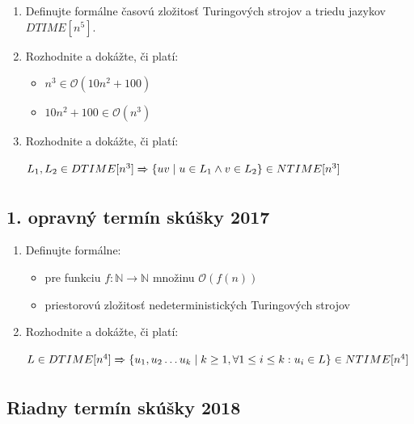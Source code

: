 \documentclass[11pt,a4paper]{article}
\begin{document}
		\begin{enumerate}
			\item Definujte formálne časovú zložitosť Turingových strojov a triedu jazykov $DTIME[n^5]$.

			\item Rozhodnite a dokážte, či platí:
	
			\begin{itemize}
				\item $n^3 \in \mathcal{O}(10n^2 + 100)$
				\item $10n^2 + 100 \in \mathcal{O}(n^3)$
			\end{itemize}
	
			\item Rozhodnite a dokážte, či platí:
	
			$L_1, L_2 \in DTIME[n^3] \xRightarrow[]{} \{ uv \mid u \in  L_1 \land v \in L_2\} \in NTIME[n^3]$
		\end{enumerate}	

		\subsection{1. opravný termín skúšky 2017}

		\begin{enumerate}
			\item Definujte formálne:

			\begin{itemize}
				\item pre funkciu $f: \mathbb{N} \rightarrow \mathbb{N}$ množinu $\mathcal{O}(f(n))$
				\item priestorovú zložitosť nedeterministických Turingových strojov
			\end{itemize}

			\item Rozhodnite a dokážte, či platí:
	
			$L \in DTIME[n^4] \xRightarrow[]{} \{ u_1, u_2 \ldots u_k \mid k \geq 1, \forall 1 \leq i \leq k: u_i \in L\} \in NTIME[n^4]$
		\end{enumerate}	

		\subsection{Riadny termín skúšky 2018}
\end{document}
